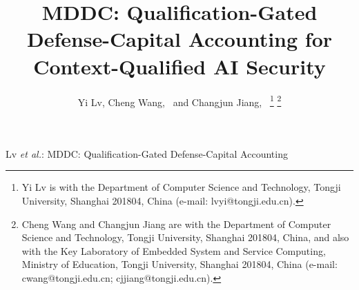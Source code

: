 ﻿\documentclass[lettersize,journal]{IEEEtran}
\begin{document}
\title{MDDC: Qualification-Gated Defense-Capital Accounting for Context-Qualified AI Security}

\author{Yi Lv,
        Cheng Wang,~
        and Changjun Jiang,~%
\thanks{Yi Lv is with the Department of Computer Science and Technology, Tongji University, Shanghai 201804, China (e-mail: lvyi@tongji.edu.cn).}
\thanks{Cheng Wang and Changjun Jiang are with the Department of Computer Science and Technology, Tongji University, Shanghai 201804, China, and also with the Key Laboratory of Embedded System and Service Computing, Ministry of Education, Tongji University, Shanghai 201804, China (e-mail: cwang@tongji.edu.cn; cjjiang@tongji.edu.cn).}}

%
{Lv \MakeLowercase{\textit{et al.}}: MDDC: Qualification-Gated Defense-Capital Accounting}

\maketitle
\end{document}
